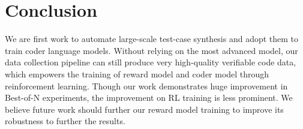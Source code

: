 \section{Conclusion}
We are first work to automate large-scale test-case synthesis and adopt them to train coder language models. Without relying on the most advanced model, our data collection pipeline can still produce very high-quality verifiable code data, which empowers the training of reward model and coder model through reinforcement learning. Though our work demonstrates huge improvement in Best-of-N experiments, the improvement on RL training is less prominent. We believe future work should further our reward model training to improve its robustness to further the results. 